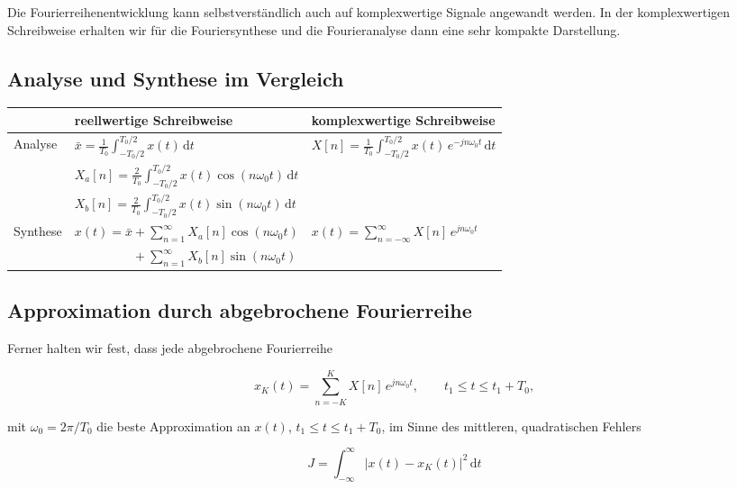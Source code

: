 Die Fourierreihenentwicklung kann selbstverständlich auch auf komplexwertige Signale angewandt werden. In der komplexwertigen Schreibweise erhalten wir für die Fouriersynthese und die Fourieranalyse dann eine sehr kompakte Darstellung.

\subsection*{Analyse und Synthese im Vergleich}

\begin{center}
\begin{tabular}{lll}
\toprule
 & \textbf{reellwertige Schreibweise} & \textbf{komplexwertige Schreibweise} \\
\midrule
\multirow{3}{*}{Analyse}
  & $\displaystyle\bar{x} = \frac{1}{T_0}\int_{-T_0/2}^{T_0/2} x(t)\,\mathrm{d}t$
  & \multirow{3}{*}{$\displaystyle X[n] = \frac{1}{T_0}\int_{-T_0/2}^{T_0/2} x(t)\,e^{-jn\omega_0 t}\,\mathrm{d}t$} \\[10pt]
  & $\displaystyle X_a[n] = \frac{2}{T_0}\int_{-T_0/2}^{T_0/2} x(t)\cos(n\omega_0 t)\,\mathrm{d}t$ & \\[10pt]
  & $\displaystyle X_b[n] = \frac{2}{T_0}\int_{-T_0/2}^{T_0/2} x(t)\sin(n\omega_0 t)\,\mathrm{d}t$ & \\[10pt]
\midrule
\multirow{2}{*}{Synthese}
  & $\displaystyle x(t) = \bar{x} + \sum_{n=1}^{\infty} X_a[n]\cos(n\omega_0 t)$
  & \multirow{2}{*}{$\displaystyle x(t) = \sum_{n=-\infty}^{\infty} X[n]\,e^{jn\omega_0 t}$} \\[6pt]
  & $\displaystyle\phantom{x(t) = \bar{x}} + \sum_{n=1}^{\infty} X_b[n]\sin(n\omega_0 t)$ & \\[6pt]
\bottomrule
\end{tabular}
\end{center}

\subsection*{Approximation durch abgebrochene Fourierreihe}

Ferner halten wir fest, dass jede abgebrochene Fourierreihe

$$
x_K(t) = \sum_{n=-K}^{K} X[n]\,e^{jn\omega_0 t}, \qquad t_1 \leq t \leq t_1 + T_0,
$$

mit $\omega_0 = 2\pi/T_0$ die beste Approximation an $x(t)$, $t_1 \leq t \leq t_1 + T_0$, im Sinne des mittleren, quadratischen Fehlers

$$
J = \int_{-\infty}^{\infty} |x(t) - x_K(t)|^2\,\mathrm{d}t
$$

